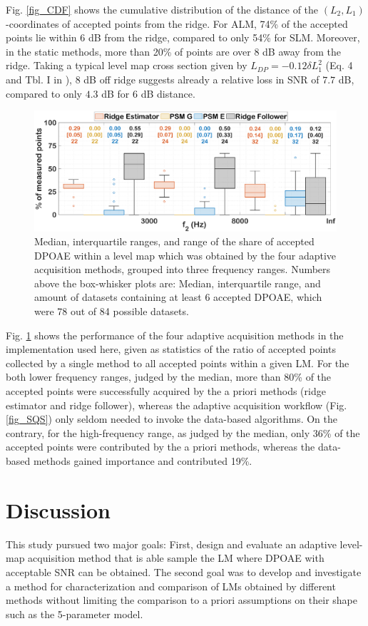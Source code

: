 \documentclass[journal,twoside,web]{ieeecolor2}
\begin{document}
Fig. \ref{fig_CDF} shows the cumulative distribution of the distance of the $(L_2, L_1)$-coordinates of accepted points from the ridge.
For ALM, 74\% of the accepted points lie within $6$ dB from the ridge, compared to only 54\% for SLM.
Moreover, in the static methods, more than 20\% of points are over $8$ dB away from the ridge.
Taking a typical level map cross section given by $L_{DP} =-0.12 \delta L_1^2$ (Eq. 4 and Tbl. I in \cite{ZD2020}), $8$ dB off ridge suggests already a relative loss in SNR of $7.7$ dB, compared to only $4.3$ dB for $6$ dB distance.

\begin{figure}[ht]
\centerline{\includegraphics[width=\columnwidth]{Fig_10_Boxplots.eps}}
\caption{Median, interquartile ranges, and range of the share of accepted DPOAE within a level map which was obtained by the four adaptive acquisition methods, grouped into three frequency ranges.
Numbers above the box-whisker plots are: Median, interquartile range, and amount of datasets containing at least 6 accepted DPOAE, which were 78 out of 84 possible datasets.}
\label{fig_BXP}
\end{figure}

Fig. \ref{fig_BXP} shows the performance of the four adaptive acquisition methods in the implementation used here, given as statistics of the ratio of accepted points collected by a single method to all accepted points within a given LM.
For the both lower frequency ranges, judged by the median, more than 80\% of the accepted points were successfully acquired by the a priori methods (ridge estimator and ridge follower), whereas the adaptive acquisition workflow (Fig. \ref{fig_SQS}) only seldom needed to invoke the data-based algorithms.
On the contrary, for the high-frequency range, as judged by the median, only 36\% of the accepted points were contributed by the a priori methods, whereas the data-based methods gained importance and contributed 19\%.

\section{Discussion}
This study pursued two major goals: First, design and evaluate an adaptive level-map acquisition method that is able sample the LM where DPOAE with acceptable SNR can be obtained.
The second goal was to develop and investigate a method for characterization and comparison of LMs obtained by different methods without limiting the comparison to a priori assumptions on their shape such as the 5-parameter model.
\end{document}

